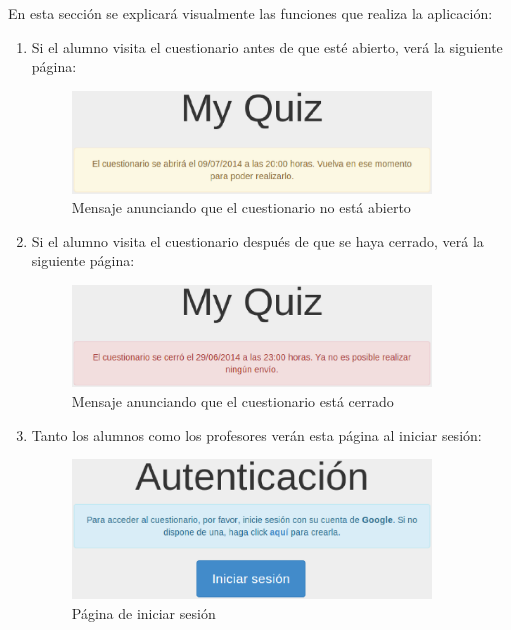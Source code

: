 En esta secci\'on se explicar\'a visualmente las funciones que realiza la aplicaci\'on:
\begin{enumerate}
  \item Si el alumno visita el cuestionario antes de que est\'e abierto, ver\'a la siguiente p\'agina:
  \begin{figure}[!th]
  \begin{center}
  \includegraphics[width=0.9\textwidth]{images/app1.eps}
  \caption{Mensaje anunciando que el cuestionario no est\'a abierto}
  \label{fig:app1}
  \end{center}
  \end{figure}
  
  \item Si el alumno visita el cuestionario despu\'es de que se haya cerrado, ver\'a la siguiente p\'agina:
  \begin{figure}[!th]
  \begin{center}
  \includegraphics[width=0.9\textwidth]{images/app2.eps}
  \caption{Mensaje anunciando que el cuestionario est\'a cerrado}
  \label{fig:app2}
  \end{center}
  \end{figure}
  \newpage
  
  \item Tanto los alumnos como los profesores ver\'an esta p\'agina al iniciar sesi\'on:
  \begin{figure}[!th]
  \begin{center}
  \includegraphics[width=0.9\textwidth]{images/app3.eps}
  \caption{P\'agina de iniciar sesi\'on}
  \label{fig:app3}
  \end{center}
  \end{figure}
  

\end{enumerate}
